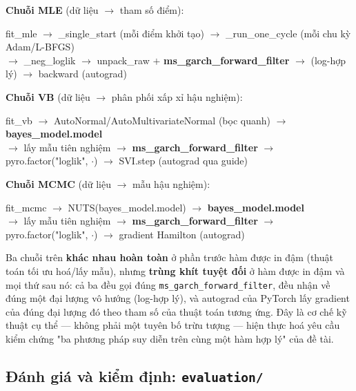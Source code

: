 \documentclass[11pt,a4paper]{article}
\newcommand{\code}[1]{\texttt{#1}}
\newcommand{\file}[1]{\texttt{#1}}
\begin{document}
\textbf{Chuỗi MLE} (dữ liệu $\to$ tham số điểm):
\begin{center}\ttfamily\footnotesize
fit\_mle $\to$ \_single\_start (mỗi điểm khởi tạo) $\to$ \_run\_one\_cycle (mỗi chu kỳ Adam/L-BFGS)\\
$\to$ \_neg\_loglik $\to$ unpack\_raw $+$ \textbf{ms\_garch\_forward\_filter} $\to$ (log-hợp lý) $\to$ backward (autograd)
\end{center}

\textbf{Chuỗi VB} (dữ liệu $\to$ phân phối xấp xỉ hậu nghiệm):
\begin{center}\ttfamily\footnotesize
fit\_vb $\to$ AutoNormal/AutoMultivariateNormal (bọc quanh) $\to$ \textbf{bayes\_model.model}\\
$\to$ lấy mẫu tiên nghiệm $\to$ \textbf{ms\_garch\_forward\_filter} $\to$ pyro.factor("loglik", $\cdot$) $\to$ SVI.step (autograd qua guide)
\end{center}

\textbf{Chuỗi MCMC} (dữ liệu $\to$ mẫu hậu nghiệm):
\begin{center}\ttfamily\footnotesize
fit\_mcmc $\to$ NUTS(bayes\_model.model) $\to$ \textbf{bayes\_model.model}\\
$\to$ lấy mẫu tiên nghiệm $\to$ \textbf{ms\_garch\_forward\_filter} $\to$ pyro.factor("loglik", $\cdot$) $\to$ gradient Hamilton (autograd)
\end{center}

Ba chuỗi trên \textbf{khác nhau hoàn toàn} ở phần trước hàm được in đậm (thuật toán
tối ưu hoá/lấy mẫu), nhưng \textbf{trùng khít tuyệt đối} ở hàm được in đậm và mọi thứ
sau nó: cả ba đều gọi đúng \code{ms\_garch\_forward\_filter}, đều nhận về đúng một
đại lượng vô hướng (log-hợp lý), và autograd của PyTorch lấy gradient của đúng đại
lượng đó theo tham số của thuật toán tương ứng. Đây là cơ chế kỹ thuật cụ thể --- không
phải một tuyên bố trừu tượng --- hiện thực hoá yêu cầu kiểm chứng "ba phương pháp
suy diễn trên cùng một hàm hợp lý" của đề tài.

\subsection{Đánh giá và kiểm định: \file{evaluation/}}
\end{document}
